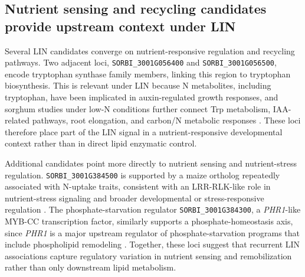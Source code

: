 \documentclass[9pt,twocolumn,twoside]{rilabRxiv}
\begin{document}



\subsection{Nutrient sensing and recycling candidates provide upstream context under LIN}

Several LIN candidates converge on nutrient-responsive regulation and recycling pathways. Two adjacent loci, \texttt{SORBI\_3001G056400} and \texttt{SORBI\_3001G056500}, encode tryptophan synthase family members, linking this region to tryptophan biosynthesis. This is relevant under LIN because N metabolites, including tryptophan, have been implicated in auxin-regulated growth responses, and sorghum studies under low-N conditions further connect Trp metabolism, IAA-related pathways, root elongation, and carbon/N metabolic responses \citep{Stepanova2008,Zhao2001,Fu2022,Liu2024,Wang2025}. These loci therefore place part of the LIN signal in a nutrient-responsive developmental context rather than in direct lipid enzymatic control.

Additional candidates point more directly to nutrient sensing and nutrient-stress regulation. \texttt{SORBI\_3001G384500} is supported by a maize ortholog repeatedly associated with N-uptake traits, consistent with an LRR-RLK-like role in nutrient-stress signaling and broader developmental or stress-responsive regulation \citep{Gladman2022SorghumBase,Luo2025,Dufayard2017}. The phosphate-starvation regulator \texttt{SORBI\_3001G384300}, a \textit{PHR1}-like MYB-CC transcription factor, similarly supports a phosphate-homeostasis axis, since \textit{PHR1} is a major upstream regulator of phosphate-starvation programs that include phospholipid remodeling \citep{Pant2015,Rubio2001,Bustos2010,Nilsson2007,Rouached2011}. Together, these loci suggest that recurrent LIN associations capture regulatory variation in nutrient sensing and remobilization rather than only downstream lipid metabolism.
\end{document}
